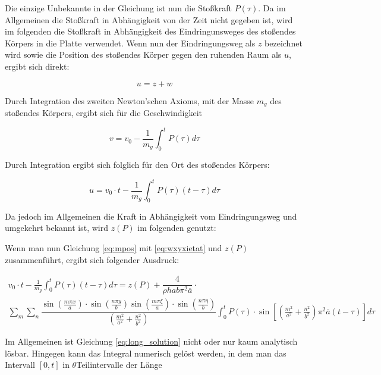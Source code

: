 Die einzige Unbekannte in der Gleichung ist nun die Stoßkraft $P(\tau)$. Da im Allgemeinen die Stoßkraft in Abhängigkeit von der Zeit nicht gegeben ist, wird im folgenden die Stoßkraft in Abhängigkeit des Eindringunsweges des stoßendes Körpers in die Platte verwendet. Wenn nun der Eindringungsweg als $z$ bezeichnet wird sowie die Position des stoßendes Körper gegen den ruhenden Raum als $u$, ergibt sich direkt:

\begin{equation}
	u = z + w
\end{equation}


Durch Integration des zweiten Newton'schen Axioms, mit der Masse $m_g$ des stoßendes Körpers, ergibt sich für die Geschwindigkeit 

\begin{equation}
	v = v_0 - \frac{1}{m_g} \int_0^t P(\tau) d\tau
\end{equation}

Durch Integration ergibt sich folglich für den Ort des stoßendes Körpers:

\begin{equation}
	u = v_0 \cdot t - \frac{1}{m_g} \int_0^t P(\tau) (t-\tau) d\tau
	\label{eq:mpos}
\end{equation}


Da jedoch im Allgemeinen die Kraft in Abhängigkeit vom Eindringungsweg und umgekehrt bekannt ist, wird $z(P)$ im folgenden genutzt:

Wenn man nun Gleichung \ref{eq:mpos} mit \ref{eq:wxyxietat} und $z(P)$ zusammenführt, ergibt sich folgender Ausdruck:


\begin{multline}
v_0 \cdot t - \frac{1}{m_g} \int_0^t P(\tau) (t-\tau) d\tau = z(P) + \dfrac{4}{\rho h a b \pi^2 \overline{a}} \cdot  \\  \sum_m \sum_n 
\dfrac{{\sin\left(\frac{m \pi x}{a}\right) \cdot \sin\left(\frac{n \pi y}{b}\right) \sin\left(\frac{m \pi \xi}{a}\right) \cdot \sin\left(\frac{n \pi \eta}{b}\right)	}}{\left(\frac{m^2}{a^2} + \frac{n^2}{b^2} \right)} 
\int_0^t
P(\tau)\cdot \sin \left[ \left(\frac{m^2}{a^2} + \frac{n^2}{b^2} \right) \pi^2 \overline{a} (t-\tau)\right] d\tau
\label{eq:long_solution}
\end{multline}

Im Allgemeinen ist Gleichung \ref{eq:long_solution} nicht oder nur kaum analytisch lösbar. Hingegen kann das Integral numerisch gelöst werden, in dem man das Intervall $\left[ 0,t \right]$ in $\theta$Teilintervalle der Länge

